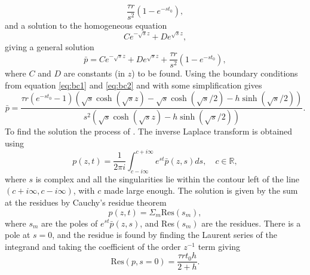 \begin{equation}
    \frac{\tau r}{s^2} \left( 1 - e^{-st_0} \right),
\end{equation}
and a solution to the homogeneous equation
\begin{equation}
    Ce^{-\sqrt{s}z} +De^{\sqrt{s}z},
\end{equation}
giving a general solution
\begin{equation}
   \bar{p} =  Ce^{-\sqrt{s}z} +De^{\sqrt{s}z} + \frac{\tau r}{s^2} \left( 1 - e^{-st_0} \right),
\end{equation}
where $C$ and $D$ are constants (in $z$) to be found. Using the boundary conditions from equation \ref{eq:bc1} and \ref{eq:bc2} and with some simplification gives
\begin{equation}\label{eq:Laplacesol}
    \bar{p} = \frac{\tau r \left( e^{-st_0} -1 \right)\left(\sqrt{s}\cosh{(\sqrt{s}z)} - \sqrt{s}\cosh{(\sqrt{s}/2)} -h\sinh{(\sqrt{s}/2)} \right)}{s^2\left(\sqrt{s}\cosh{(\sqrt{s}z)} - h\sinh{(\sqrt{s}/2)} \right)}.
\end{equation}
To find the solution the process of \cite{Hsieh1981}. The inverse Laplace transform is obtained using
\begin{equation}
    p(z,t) = \frac{1}{2\pi i}\int^{c+i\infty}_{c-i\infty}e^{st}\bar{p}(z,s)ds,\quad c \in \mathbb{R},
\end{equation}
where $s$ is complex and all the singularities lie within the contour left of the line $(c+i\infty,c-i\infty)$, with $c$ made large enough. The solution is given by the sum at the residues by Cauchy's residue theorem
\begin{equation}
    p(z,t) = \Sigma_m \mathrm{Res}(s_m),
\end{equation}
where $s_m$ are the poles of $e^{st}\bar{p}(z,s)$, and Res$(s_m)$ are the residues. There is a pole at $s=0$, and the residue is found by finding the Laurent series of the integrand and taking the coefficient of the order $z^{-1}$ term giving
\begin{equation}
    \mathrm{Res}(p,s=0) = \frac{\tau r t_0 h}{2+h}.
\end{equation}



